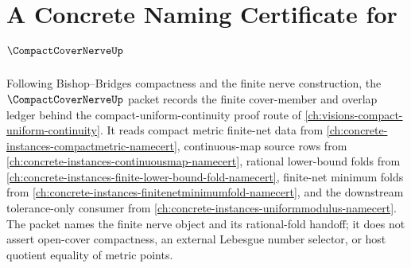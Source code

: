 \chapter{A Concrete Naming Certificate for $\CompactCoverNerveUp$}
\label{ch:concrete-instances-compact-cover-nerve-namecert}

Following Bishop--Bridges compactness and the finite nerve construction, the $\CompactCoverNerveUp$ packet records the finite cover-member and overlap ledger behind the compact-uniform-continuity proof route of \autoref{ch:visions-compact-uniform-continuity}. It reads compact metric finite-net data from \autoref{ch:concrete-instances-compactmetric-namecert}, continuous-map source rows from \autoref{ch:concrete-instances-continuousmap-namecert}, rational lower-bound folds from \autoref{ch:concrete-instances-finite-lower-bound-fold-namecert}, finite-net minimum folds from \autoref{ch:concrete-instances-finitenetminimumfold-namecert}, and the downstream tolerance-only consumer from \autoref{ch:concrete-instances-uniformmodulus-namecert}. The packet names the finite nerve object and its rational-fold handoff; it does not assert open-cover compactness, an external Lebesgue number selector, or host quotient equality of metric points.

